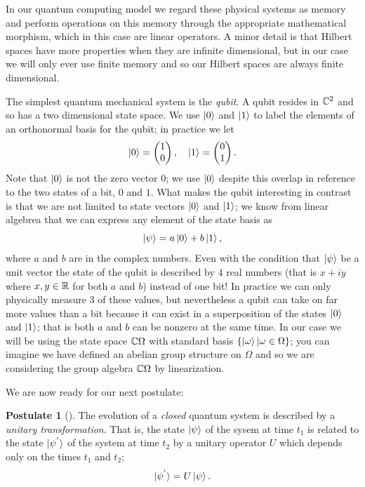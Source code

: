 \documentclass[12pt,twoside]{reedthesis}
\theoremstyle{plain}   %
\theoremstyle{definition}
\newtheorem{post}{Postulate}[section]
\theoremstyle{remark}
\numberwithin{equation}{section}
\begin{document}
  In our quantum computing model we regard these physical systems as memory and perform operations on this memory through the appropriate mathematical morphism, which in this case are linear operators.
  A minor detail is that Hilbert spaces have more properties when they are infinite dimensional, but in our case we will only ever use finite memory and so our Hilbert spaces are always finite dimensional. \par
  The simplest quantum mechanical system is the \emph{qubit}. A qubit resides in $\mathbb{C}^2$ and so has a two dimensional state space.
  We use $\ket{0}$ and $\ket{1}$ to label the elements of an orthonormal basis for the qubit; in practice we let
  \[\ket{0} =
    \begin{pmatrix}
      1 \\
      0
    \end{pmatrix},
    \quad
    \ket{1} =
    \begin{pmatrix}
      0 \\
      1
    \end{pmatrix}.
  \]
  Note that $\ket{0}$ is not the zero vector $0$; we use $\ket{0}$ despite this overlap in reference to the two states of a bit, $0$ and $1$.
  What makes the qubit interesting in contrast is that we are not limited to state vectors $\ket{0}$ and $\ket{1}$; we know from linear algebrea that
  we can express any element of the state basis as
  \[\ket{\psi} = a \ket{0} + b \ket{1}, \]
  where $a$ and $b$ are in the complex numbers. Even with the condition that $\ket{\psi}$ be a unit vector
  the state of the qubit is described by $4$ real numbers (that is $x +iy$ where $x,y \in \mathbb{R}$ for both $a$ and $b$) instead of one bit! In practice we can only physically measure $3$ of these values,
  but nevertheless a qubit can take on far more values than a bit because it can exist in a superposition of the states $\ket{0}$ and $\ket{1}$; that is both $a$ and $b$ can be nonzero at the same time.
  In our case we will be using the state space $\mathbb{C} \Omega$ with standard basis $\{ \ket{\omega} | \omega \in \Omega\}$; you can imagine we have defined an abelian group structure on $\Omega$ and so we are
  considering the group algebra $\mathbb{C} \Omega$ by linearization. \par
  We are now ready for our next postulate:
  \begin{post}[{\cite[2.2.2]{nielsen2010}}]
    The evolution of a \emph{closed} quantum system is described by a \emph{unitary transformation}. That is, the state $\ket{\psi}$ of the sysem at time $t_1$ is related to the state
    $\ket{ \psi^{'} }$ of the system at time $t_2$ by a unitary operator $U$ which depends only on the times $t_1$ and $t_2$;
    \[ \ket{\psi^{'}} = U \ket{\psi}.\]
  \end{post}
\end{document}
